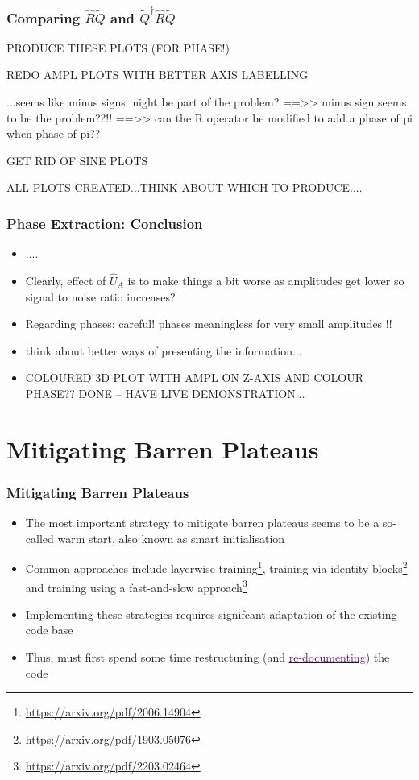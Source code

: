 \documentclass{beamer}
\begin{document}
\begin{frame}
\frametitle{Comparing $\hat{R} \tilde{Q}$ and $\tilde{Q}^\dagger \hat{R} \tilde{Q}$}

PRODUCE THESE PLOTS (FOR PHASE!)

REDO AMPL PLOTS WITH BETTER AXIS LABELLING

...seems like minus signs might be part of the problem?
==>> minus sign seems to be the problem??!! 
==>> can the R operator be modified to add a phase of pi when phase of pi??

GET RID OF SINE PLOTS 

ALL PLOTS CREATED...THINK ABOUT WHICH TO PRODUCE....

\end{frame}

\begin{frame}
\frametitle{Phase Extraction: Conclusion}
\begin{itemize}
\item .... 
\item Clearly, effect of $\hat{U}_A$ is to make things a bit worse as amplitudes get lower so signal to noise ratio increases? 
\item Regarding phases: careful! phases meaningless for very small amplitudes !!
\item think about better ways of presenting the information... 
\item COLOURED 3D PLOT WITH AMPL ON Z-AXIS AND COLOUR PHASE?? DONE -- HAVE LIVE DEMONSTRATION...
\end{itemize}

\end{frame}

\section{Mitigating Barren Plateaus}

\begin{frame}
\frametitle{Mitigating Barren Plateaus}
\begin{itemize}
\item The most important strategy to mitigate barren plateaus seems to be a so-called \alert{warm start}, also known as \alert{smart initialisation}
\item Common approaches include layerwise training\footnote{\url{https://arxiv.org/pdf/2006.14904}}, training via identity blocks\footnote{\url{https://arxiv.org/pdf/1903.05076}} and training using a fast-and-slow approach\footnote{\url{https://arxiv.org/pdf/2203.02464}}
\item Implementing these strategies requires signifcant adaptation of the existing code base 
\item Thus, must first \alert{spend some time restructuring} (and \href{http://localhost:8080/pqcprep.html}{\textcolor{purple}{re-documenting}}) the code  
\end{itemize}
\end{frame}
\end{document}
